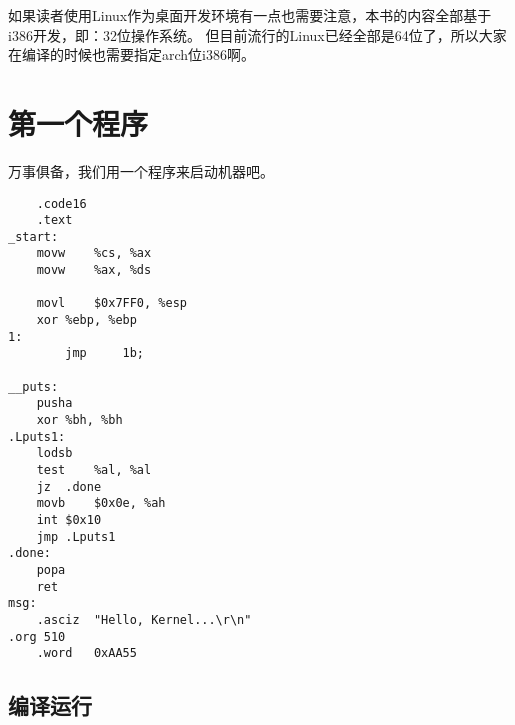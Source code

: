 如果读者使用Linux作为桌面开发环境有一点也需要注意，本书的内容全部基于i386开发，即：32位操作系统。
但目前流行的Linux已经全部是64位了，所以大家在编译的时候也需要指定arch位i386啊。

\section{第一个程序}

万事俱备，我们用一个程序来启动机器吧。
\begin{lstlisting}
	.code16
	.text
_start:	
	movw	%cs, %ax
	movw	%ax, %ds

	movl	$0x7FF0, %esp
	xor	%ebp, %ebp
1:
        jmp     1b;

__puts:
	pusha
	xor	%bh, %bh
.Lputs1:
	lodsb
	test	%al, %al
	jz	.done
	movb	$0x0e, %ah
	int	$0x10
	jmp	.Lputs1
.done:	
	popa
	ret
msg:
	.asciz	"Hello, Kernel...\r\n"
.org 510
	.word	0xAA55
\end{lstlisting}
\subsection{编译运行}
